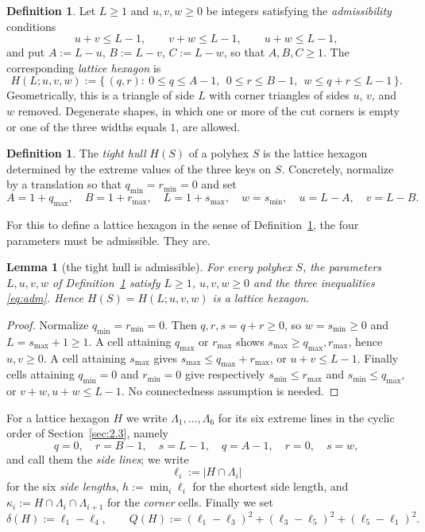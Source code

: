 \documentclass[11pt]{article}
\theoremstyle{plain}
\newtheorem{lemma}[theorem]{Lemma}
\theoremstyle{definition}
\newtheorem{definition}[theorem]{Definition}
\theoremstyle{remark}
\begin{document}
\begin{definition}\label{def:hexagon}
Let \(L\ge1\) and \(u,v,w\ge0\) be integers satisfying the \emph{admissibility} conditions
\begin{equation}\label{eq:adm}
   u+v\le L-1,\qquad v+w\le L-1,\qquad u+w\le L-1 ,
\end{equation}
and put \(A:=L-u\), \(B:=L-v\), \(C:=L-w\), so that \(A,B,C\ge1\). The corresponding
\emph{lattice hexagon} is
\[
   H(L;u,v,w):=\{\,(q,r):\ 0\le q\le A-1,\ \ 0\le r\le B-1,\ \ w\le q+r\le L-1\,\}.
\]
Geometrically, this is a triangle of side \(L\) with corner triangles of sides \(u\), \(v\), and
\(w\) removed. Degenerate shapes, in which one or more of the cut corners is empty or one
of the three widths equals \(1\), are allowed.
\end{definition}

\begin{definition}\label{def:hull}
The \emph{tight hull} \(H(S)\) of a polyhex \(S\) is the lattice hexagon determined by the
extreme values of the three keys on \(S\). Concretely, normalize by a translation so that
\(q_{\min}=r_{\min}=0\) and set
\[
   A=1+q_{\max},\quad B=1+r_{\max},\quad L=1+s_{\max},\quad w=s_{\min},\quad
   u=L-A,\quad v=L-B .
\]
\end{definition}

For this to define a lattice hexagon in the sense of Definition~\ref{def:hexagon}, the
four parameters must be admissible. They are.

\begin{lemma}[the tight hull is admissible]\label{lem:tightadm}
For every polyhex \(S\), the parameters \(L,u,v,w\) of Definition~\ref{def:hull} satisfy
\(L\ge1\), \(u,v,w\ge0\) and the three inequalities \eqref{eq:adm}. Hence
\(H(S)=H(L;u,v,w)\) is a lattice hexagon.
\end{lemma}

\begin{proof}
Normalize \(q_{\min}=r_{\min}=0\). Then \(q,r,s=q+r\ge0\),
so \(w=s_{\min}\ge0\) and \(L=s_{\max}+1\ge1\).
A cell attaining \(q_{\max}\) or \(r_{\max}\) shows
\(s_{\max}\ge q_{\max},r_{\max}\), hence \(u,v\ge0\).
A cell attaining \(s_{\max}\) gives
\(s_{\max}\le q_{\max}+r_{\max}\), or \(u+v\le L-1\).
Finally cells attaining \(q_{\min}=0\) and \(r_{\min}=0\)
give respectively \(s_{\min}\le r_{\max}\) and
\(s_{\min}\le q_{\max}\), or \(v+w,u+w\le L-1\).
No connectedness assumption is needed.
\end{proof}

For a lattice hexagon \(H\) we write \(\Lambda_{1},\dots,\Lambda_{6}\) for its six extreme
lines in the cyclic order of Section~\ref{sec:2.3}, namely
\[
   q=0,\quad r=B-1,\quad s=L-1,\quad q=A-1,\quad r=0,\quad s=w ,
\]
and call them the \emph{side lines}; we write
\[
   \ell_{i}:=|H\cap\Lambda_{i}|
\]
for the six \emph{side lengths}, \(h:=\min_{i}\ell_{i}\) for the shortest side length, and
\(\kappa_{i}:=H\cap\Lambda_{i}\cap\Lambda_{i+1}\) for the \emph{corner} cells. Finally we
set
\[
   \delta(H):=\ell_{1}-\ell_{4},
   \qquad
   Q(H):=(\ell_{1}-\ell_{3})^{2}+(\ell_{3}-\ell_{5})^{2}+(\ell_{5}-\ell_{1})^{2} .
\]
\end{document}
